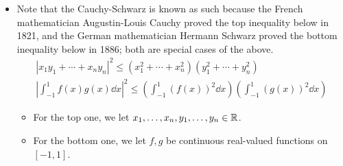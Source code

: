 \documentclass[../main.tex]{subfiles}
\begin{document}
\begin{itemize}
\begin{theorem}
\begin{proof}
\begin{equation*}
            \end{equation*}
            and we also have that the equality holds since $v=0=0u$, $0\in\F$. Now let $v\neq 0$. Then by Theorem \ref{trm:orthogonalDecomposition},
            \begin{equation*}
                u = \frac{\inp{u}{v}}{\norm{v}^2}v+w
            \end{equation*}
            where $\inp{v}{w}=0$. It follows by the \hyperref[trm:pythagorean]{Pythagorean Theorem} that
            \begin{align*}
                \norm{u}^2 &= \norm{\frac{\inp{u}{v}}{\norm{v}^2}v}^2+\norm{w}^2\\
                &= \frac{|\inp{u}{v}|^2}{\norm{v}^4}\norm{v}^2+\norm{w}^2\tag*{Theorem \ref{trm:normPropertiesb}}\\
                &= \frac{|\inp{u}{v}|^2}{\norm{v}^2}+\norm{w}^2\\
                &\geq \frac{|\inp{u}{v}|^2}{\norm{v}^2}
            \end{align*}
            Multiplying both sides by $\norm{v}^2$ and taking square roots gives the desired inequality.\par
            Also note that the Cauchy-Schwarz inequality is an equality iff the last line is an equality, which happens iff $w=0$. But $w=0$ iff $u$ is a scalar multiple of $v$, as desired.
        \end{proof}
    \end{theorem}
    \item Note that the Cauchy-Schwarz is known as such because the French mathematician Augustin-Louis Cauchy proved the top inequality below in 1821, and the German mathematician Hermann Schwarz proved the bottom inequality below in 1886; both are special cases of the above.
    \begin{gather*}
        |x_1y_1+\cdots+x_ny_n|^2 \leq (x_1^2+\cdots+x_n^2)(y_1^2+\cdots+y_n^2)\\
        \left| \int_{-1}^1f(x)g(x)\dd{x} \right|^2 \leq \left( \int_{-1}^1(f(x))^2\dd{x} \right)\left( \int_{-1}^1(g(x))^2\dd{x} \right)
    \end{gather*}
    \begin{itemize}
        \item For the top one, we let $x_1,\dots,x_n,y_1,\dots,y_n\in\mathbb{R}$.
        \item For the bottom one, we let $f,g$ be continuous real-valued functions on $[-1,1]$.
    \end{itemize}

\end{itemize}
\end{document}
